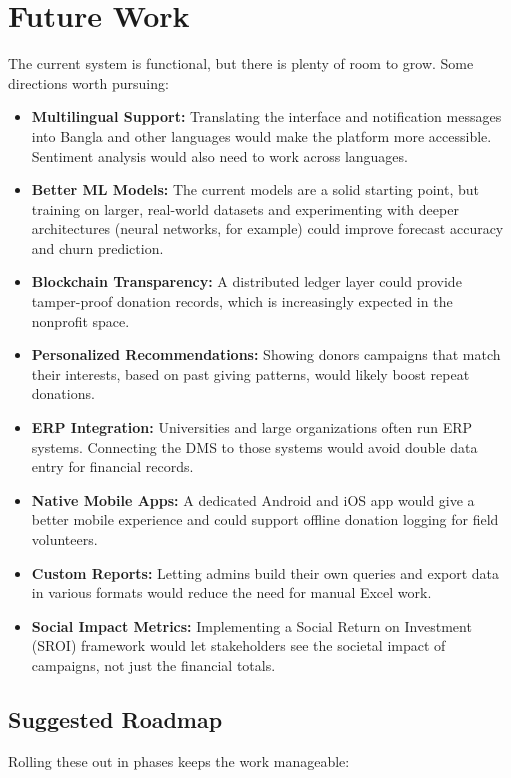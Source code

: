 \documentclass{thesis-library}
\begin{document}
\section{Future Work}

The current system is functional, but there is plenty of room to grow. Some directions worth pursuing:

\begin{itemize}
    \item \textbf{Multilingual Support:} Translating the interface and notification messages into Bangla and other languages would make the platform more accessible. Sentiment analysis would also need to work across languages.
    \item \textbf{Better ML Models:} The current models are a solid starting point, but training on larger, real-world datasets and experimenting with deeper architectures (neural networks, for example) could improve forecast accuracy and churn prediction.
    \item \textbf{Blockchain Transparency:} A distributed ledger layer could provide tamper-proof donation records, which is increasingly expected in the nonprofit space.
    \item \textbf{Personalized Recommendations:} Showing donors campaigns that match their interests, based on past giving patterns, would likely boost repeat donations.
    \item \textbf{ERP Integration:} Universities and large organizations often run ERP systems. Connecting the DMS to those systems would avoid double data entry for financial records.
    \item \textbf{Native Mobile Apps:} A dedicated Android and iOS app would give a better mobile experience and could support offline donation logging for field volunteers.
    \item \textbf{Custom Reports:} Letting admins build their own queries and export data in various formats would reduce the need for manual Excel work.
    \item \textbf{Social Impact Metrics:} Implementing a Social Return on Investment (SROI) framework would let stakeholders see the societal impact of campaigns, not just the financial totals.
\end{itemize}

\subsection{Suggested Roadmap}
Rolling these out in phases keeps the work manageable:
\end{document}
